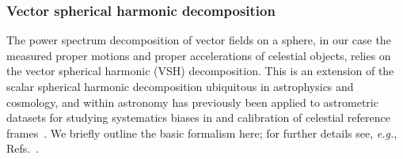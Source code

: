 \documentclass[prd,aps,twocolumn,nofootinbib,superscriptaddress,preprintnumbers,balancelastpage,longbibliography,floatfix]{revtex4-1}
\begin{document}
\subsubsection*{Vector spherical harmonic decomposition}

The power spectrum decomposition of vector fields on a sphere, in our case the measured proper motions and proper accelerations of celestial objects, relies on the vector spherical harmonic (VSH) decomposition. This is an extension of the scalar spherical harmonic decomposition ubiquitous in astrophysics and cosmology, and within astronomy has previously been applied to astrometric datasets for studying systematics biases in and calibration of celestial reference frames~\cite{Mignard:2012xm,Undefined:2018amf,2018A&A...609A..19L}. We briefly outline the basic formalism here; for further details see, \emph{e.g.}, Refs.~\cite{arfken2013mathematical,Kostelec:2000:CHA:351065.351076}.
\end{document}
